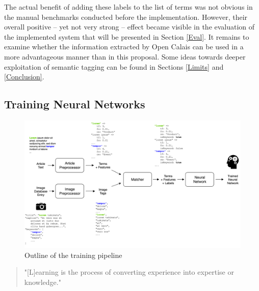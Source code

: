 \documentclass[11pt,a4paper,twoside]{article}
\begin{document}
The actual benefit of adding these labels to the list of terms was not obvious in the manual benchmarks conducted before the implementation. However, their overall positive -- yet not very strong -- effect became visible in the evaluation of the implemented system that will be presented in Section \ref{Eval}. It remains to examine whether the information extracted by Open Calais can be used in a more advantageous manner than in this proposal. Some ideas towards deeper exploitation of semantic tagging can be found in Sections \ref{Limits} and \ref{Conclusion}.

\subsection{Training Neural Networks} \label{SystemTrain}

\begin{figure}[t]
  \includegraphics[width=\columnwidth]{picpic-training.png}
  \caption{Outline of the training pipeline}
  \label{fig:picpic-training}
\end{figure}

\begin{quote}
    "[L]earning is the process of converting experience into expertise or knowledge."
    
    \cite[p. 1]{Shalev-Shwartz2014UnderstandingAlgorithms}
\end{quote}
\end{document}
